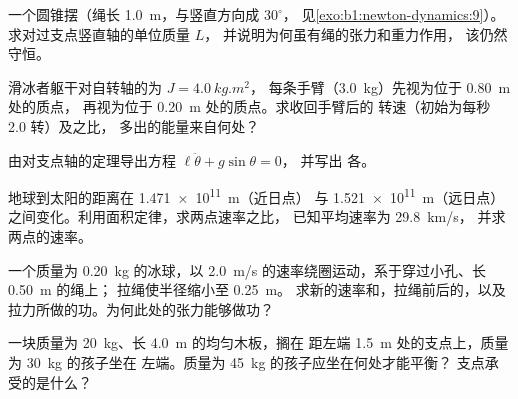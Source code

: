 \begin{exercise}[$\star$]\label{exo:b1:angular-momentum:3}
一个圆锥摆（绳长 \qty{1.0}{m}，与竖直方向成 $30^\circ$，
见\cref{exo:b1:newton-dynamics:9}）。求对过支点竖直轴的单位质量 $L$，
并说明为何虽有绳的张力和重力作用，
该仍然守恒。
\end{exercise}

\begin{exercise}[$\star$]\label{exo:b1:angular-momentum:4}
滑冰者躯干对自转轴的为 $J = \qty{4.0}{kg.m^2}$，
每条手臂（\qty{3.0}{kg}）先视为位于 \qty{0.80}{m} 处的质点，
再视为位于 \qty{0.20}{m} 处的质点。求收回手臂后的
转速（初始为每秒 \qty{2.0}{} 转）及之比，
多出的能量来自何处？
\end{exercise}

\begin{exercise}[$\star\star$]\label{exo:b1:angular-momentum:5}
由对支点轴的定理导出方程 $\ell\ddot\theta + g\sin\theta = 0$，
并写出
各。
\end{exercise}

\begin{exercise}[$\star\star$]\label{exo:b1:angular-momentum:6}
地球到太阳的距离在 \qty{1.471e11}{m}（近日点）
与 \qty{1.521e11}{m}（远日点）之间变化。利用面积定律，求两点速率之比，
已知平均速率为 \qty{29.8}{km/s}，
并求两点的速率。
\end{exercise}

\begin{exercise}[$\star\star$]\label{exo:b1:angular-momentum:7}
一个质量为 \qty{0.20}{kg} 的冰球，以 \qty{2.0}{m/s} 的速率绕圈运动，系于穿过小孔、长 \qty{0.50}{m} 的绳上；
拉绳使半径缩小至 \qty{0.25}{m}。
求新的速率和，拉绳前后的，以及
拉力所做的功。为何此处的张力能够做功？
\end{exercise}

\begin{exercise}[$\star\star$]\label{exo:b1:angular-momentum:8}
一块质量为 \qty{20}{kg}、长 \qty{4.0}{m} 的均匀木板，搁在
距左端 \qty{1.5}{m} 处的支点上，质量为 \qty{30}{kg} 的孩子坐在
左端。质量为 \qty{45}{kg} 的孩子应坐在何处才能平衡？
支点承受的是什么？
\end{exercise}

